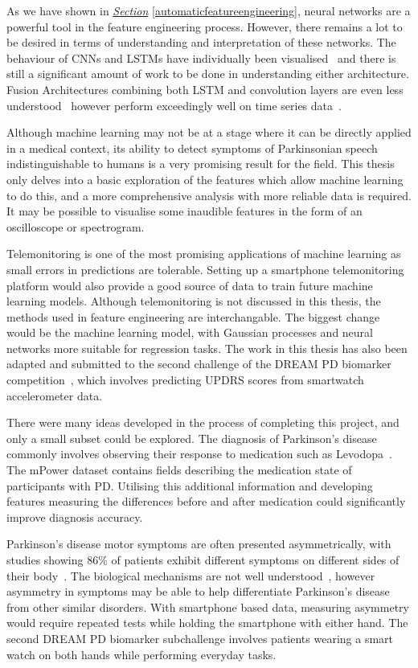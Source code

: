 \documentclass[12pt, twoside]{book}
\begin{document}
As we have shown in \textit{\hyperref[automaticfeatureengineering]{Section}} \ref{automaticfeatureengineering}, neural networks are a powerful tool in the feature engineering process. However, there remains a lot to be desired in terms of understanding and interpretation of these networks. The behaviour of CNNs and LSTMs have individually been visualised~\cite{cnnvis, visualisernn} and there is still a significant amount of work to be done in understanding either architecture. Fusion Architectures combining both LSTM and convolution layers are even less understood~\cite{LRCN} however perform exceedingly well on time series data~\cite{convlstm}. 


Although machine learning may not be at a stage where it can be directly applied in a medical context, its ability to detect symptoms of Parkinsonian speech indistinguishable to humans is a very promising result for the field. This thesis only delves into a basic exploration of the features which allow machine learning to do this, and a more comprehensive analysis with more reliable data is required. It may be possible to visualise some inaudible features in the form of an oscilloscope or spectrogram.

Telemonitoring is one of the most promising applications of machine learning as small errors in predictions are tolerable. Setting up a smartphone telemonitoring platform would also provide a good source of data to train future machine learning models. Although telemonitoring is not discussed in this thesis, the methods used in feature engineering are interchangable. The biggest change would be the machine learning model, with Gaussian processes and neural networks more suitable for regression tasks. The work in this thesis has also been adapted and submitted to the second challenge of the DREAM PD biomarker competition~\cite{dreamchallengeinfo}, which involves predicting UPDRS scores from smartwatch accelerometer data.


There were many ideas developed in the process of completing this project, and only a small subset could be explored. The diagnosis of Parkinson's disease commonly involves observing their response to medication such as Levodopa~\cite{tolosadiagnosis26}. The mPower dataset contains fields describing the medication state of participants with PD. Utilising this additional information and developing features measuring the differences before and after medication could significantly improve diagnosis accuracy.

Parkinson's disease motor symptoms are often presented asymmetrically, with studies showing 86\% of patients exhibit different symptoms on different sides of their body~\cite{pdasymmetry}. The biological mechanisms are not well understood~\cite{djaldetti2006mystery}, however asymmetry in symptoms may be able to help differentiate Parkinson's disease from other similar disorders. With smartphone based data, measuring asymmetry would require repeated tests while holding the smartphone with either hand. The second DREAM PD biomarker subchallenge involves patients wearing a smart watch on both hands while performing everyday tasks.
\end{document}
